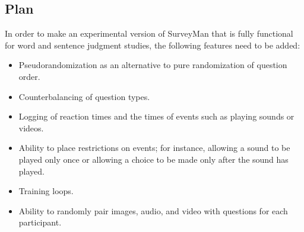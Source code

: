 

\subsection{Plan}
In order to make an experimental version of SurveyMan that is fully functional
for word and sentence judgment studies, the following features need to be added:

\begin{itemize}
\item Pseudorandomization as an alternative to pure randomization of question order.
\item Counterbalancing of question types.
\item Logging of reaction times and the times of events such as playing sounds or videos.
\item Ability to place restrictions on events; for instance, allowing a sound to be played
only once or allowing a choice to be made only after the sound has played.
\item Training loops.
\item Ability to randomly pair images, audio, and video with questions for each participant.
\end{itemize}

